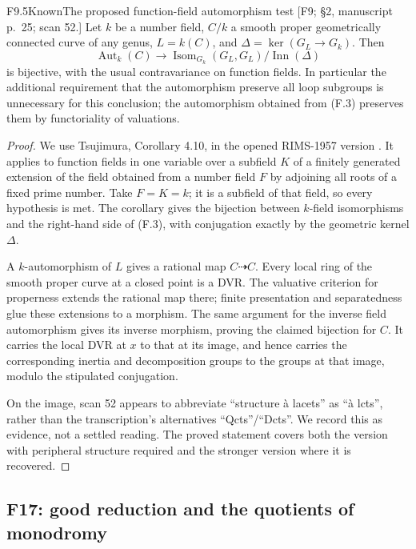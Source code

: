 \begin{result}{F9.5}{Known}{The proposed function-field automorphism test}
\textup{[F9; \S2, manuscript p.\ 25; scan 52.]}
Let $k$ be a number field, $C/k$ a smooth proper geometrically connected
curve of any genus, $L=k(C)$, and
$\Delta=\ker(G_L\to G_k)$. Then
\[
 \operatorname{Aut}_k(C)\longrightarrow
 \operatorname{Isom}_{G_k}(G_L,G_L)/\operatorname{Inn}(\Delta)
 \tag{F.3}
\]
is bijective, with the usual contravariance on function fields.
In particular the additional requirement that the automorphism
preserve all loop subgroups is unnecessary for this conclusion;
the automorphism obtained from (F.3) preserves them by functoriality
of valuations.
\end{result}

\begin{proof}
We use Tsujimura, Corollary 4.10, in the opened RIMS-1957 version
\cite{CF_Tsujimura2023}. It applies to function fields in one variable
over a subfield $K$ of a finitely generated extension of the field
obtained from a number field $F$ by adjoining all roots of a fixed
prime number. Take $F=K=k$; it is a subfield of that field, so every
hypothesis is met. The corollary gives the bijection between
$k$-field isomorphisms and the right-hand side of (F.3), with
conjugation exactly by the geometric kernel $\Delta$.

A $k$-automorphism of $L$ gives a rational map $C\dashrightarrow C$.
Every local ring of the smooth proper curve at a closed point is a
DVR. The valuative criterion for properness extends the rational map
there; finite presentation and separatedness glue these extensions
to a morphism. The same argument for the inverse field automorphism
gives its inverse morphism, proving the claimed bijection for $C$.
It carries the local DVR at $x$ to that at its image, and hence
carries the corresponding inertia and decomposition groups to the
groups at that image, modulo the stipulated conjugation.

On the image, scan 52 appears to abbreviate ``structure \`a lacets''
as ``\`a lcts'', rather than the transcription's alternatives
``Qcts''/``Dcts''. We record this as evidence, not a settled reading.
The proved statement covers both the version with peripheral
structure required and the stronger version where it is recovered.
\end{proof}

\subsection{F17: good reduction and the quotients of monodromy}

